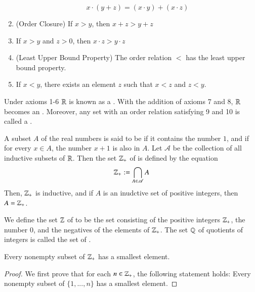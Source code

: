 \documentclass[12pt, a4paper, oneside, openright, titlepage]{book}
\begin{document}
\begin{appendices}
\begin{cons}
\begin{enumerate}
\begin{equation}
                    x\cdot (y+z) = (x\cdot y) + (x\cdot z)
                \end{equation}
            \item (Order Closure) If $x > y$, then $x+z > y+z$
            \item If $x > y$ and $z > 0$, then $x\cdot z > y\cdot z$
            \item (Least Upper Bound Property) The order relation $<$ has the least upper bound property.
            \item If $x < y$, there exists an element $z$ such that $x < z$ and $z < y$.
        \end{enumerate}
        Under axioms 1-6 $\mathbb R$ is known as a . With the addition of axioms 7 and 8, $\mathbb R$ becomes an . Moreover, any set with an order relation satisfying 9 and 10 is called a .
    \end{cons}

    \begin{defn}
        A subset $A$ of the real numbers is said to be  if it contains the number $1$, and if for every $x \in A$, the number $x+1$ is also in $A$. Let $\mathscr{A}$ be the collection of all inductive subsets of $\mathbb R$. Then the set $\mathbb Z_{+}$ of  is defined by the equation \begin{equation}
            \mathbb Z_+ := \bigcap\limits_{A\in\mathscr{A}}A
        \end{equation}
        Then, $\mathbb Z_+$ is inductive, and if $A$ is an inudctive set of positive integers, then $A = \mathbb Z_+$.
    \end{defn}

    \begin{defn}[Integers]
        We define the set $\mathbb Z$ of  to be the set consisting of the positive integers $\mathbb Z_+$, the number $0$, and the negatives of the elements of $\mathbb Z_+$. The set $\mathbb Q$ of quotients of integers is called the set of .
    \end{defn}

    \begin{namthm}
        Every nonempty subset of $\mathbb Z_+$ has a smallest element.
    \end{namthm}
    \begin{proof}
        We first prove that for each $n \in \mathbb Z_+$, the following statement holds: Every nonempty subset of $\{1,...,n\}$ has a smallest element.


\end{proof}
\end{appendices}
\end{document}
